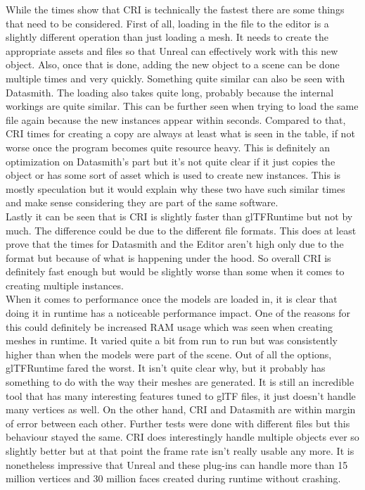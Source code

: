 While the times show that \acs{CRI} is technically the fastest there are some things that need to be considered. First of all, loading in the file to the editor is a slightly different operation than just loading a mesh. It needs to create the appropriate assets and files so that Unreal can effectively work with this new object. Also, once that is done, adding the new object to a scene can be done multiple times and very quickly. Something quite similar can also be seen with Datasmith. The loading also takes quite long, probably because the internal workings are quite similar. This can be further seen when trying to load the same file again because the new instances appear within seconds. Compared to that, CRI times for creating a copy are always at least what is seen in the table, if not worse once the program becomes quite resource heavy. This is definitely an optimization on Datasmith's part but it's not quite clear if it just copies the object or has some sort of asset which is used to create new instances. This is mostly speculation but it would explain why these two have such similar times and make sense considering they are part of the same software.\\
Lastly it can be seen that is \acs{CRI} is slightly faster than glTFRuntime but not by much. The difference could be due to the different file formats. This does at least prove that the times for Datasmith and the Editor aren't high only due to the format but because of what is happening under the hood. So overall \acs{CRI} is definitely fast enough but would be slightly worse than some when it comes to creating multiple instances.\\

When it comes to performance once the models are loaded in, it is clear that doing it in runtime has a noticeable performance impact. One of the reasons for this could definitely be increased RAM usage which was seen when creating meshes in runtime. It varied quite a bit from run to run but was consistently higher than when the models were part of the scene. Out of all the options, glTFRuntime fared the worst. It isn't quite clear why, but it probably has something to do with the way their meshes are generated. It is still an incredible tool that has many interesting features tuned to glTF files, it just doesn't handle many vertices as well. On the other hand, CRI and Datasmith are within margin of error between each other. Further tests were done with different files but this behaviour stayed the same. CRI does interestingly handle multiple objects ever so slightly better but at that point the frame rate isn't really usable any more. It is nonetheless impressive that Unreal and these plug-ins can handle more than 15 million vertices and 30 million faces created during runtime without crashing. 

